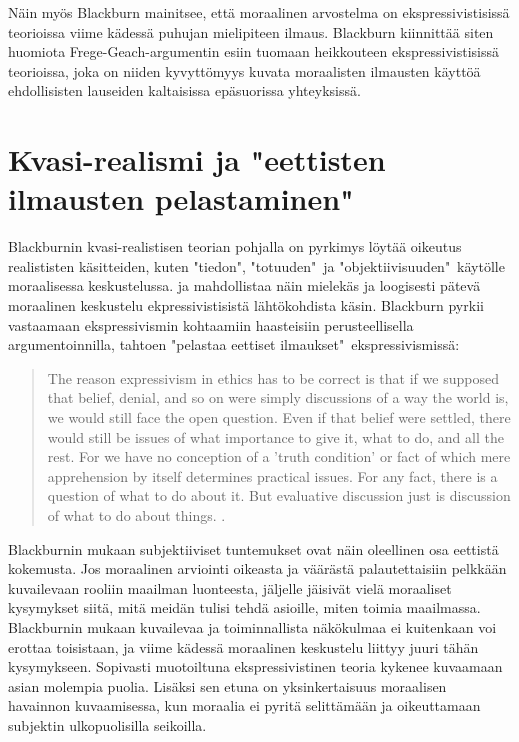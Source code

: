 \documentclass[a4paper,12pt,times,titlepage,finnish]{article}
\begin{document}
Näin myös Blackburn mainitsee, että moraalinen arvostelma on ekspressivistisissä teorioissa viime kädessä puhujan mielipiteen ilmaus. Blackburn kiinnittää siten huomiota Frege-Geach-argumentin esiin tuomaan heikkouteen ekspressivistisissä teorioissa, joka on niiden kyvyttömyys kuvata moraalisten ilmausten käyttöä ehdollisisten lauseiden kaltaisissa epäsuorissa yhteyksissä.


\section{Kvasi-realismi ja "eettisten ilmausten pelastaminen"}

Blackburnin kvasi-\-realistisen teorian pohjalla on pyrkimys löytää oikeutus realististen käsitteiden, kuten "tiedon", "totuuden"\ ja "objektiivisuuden"\ käytölle moraalisessa keskustelussa. ja mahdollistaa näin mielekäs ja loogisesti pätevä moraalinen keskustelu ekpressivistisistä läh\-tö\-koh\-dis\-ta käsin. Blackburn pyrkii vastaamaan ekspressivismin kohtaamiin haasteisiin perusteellisella argumentoinnilla, tahtoen "pelastaa eettiset ilmaukset"\  eks\-pres\-si\-vis\-mis\-sä:

\begin{quote}
	The reason expressivism in ethics has to be correct is that if we supposed that belief, denial, and so on were simply discussions of a way the world is, we would still face the open question. Even if that belief were settled, there would still be issues of what importance to give it, what to do, and all the rest. For we have no conception of a 'truth condition' or fact of which mere apprehension by itself determines practical issues. For any fact, there is a question of what to do about it. But evaluative discussion just is discussion of what to do about things. \citep[70]{Blackburn98}.
\end{quote}

Blackburnin mukaan subjektiiviset tuntemukset ovat näin oleellinen osa eettistä kokemusta. Jos moraalinen arviointi oikeasta ja väärästä palautettaisiin pelkkään kuvailevaan rooliin maailman luonteesta, jäljelle jäisivät vielä moraaliset kysymykset siitä, mitä meidän tulisi tehdä asioille, miten toimia maailmassa. Blackburnin mukaan kuvailevaa ja toiminnallista näkökulmaa ei kuitenkaan voi erottaa toisistaan, ja viime kädessä moraalinen keskustelu liittyy juuri tähän kysymykseen. Sopivasti muotoiltuna ekspressivistinen teoria kykenee kuvaamaan asian molempia puolia. Lisäksi sen etuna on yksinkertaisuus moraalisen havainnon kuvaamisessa, kun moraalia ei pyritä selittämään ja oikeuttamaan subjektin ulkopuolisilla seikoilla. 
\end{document}
